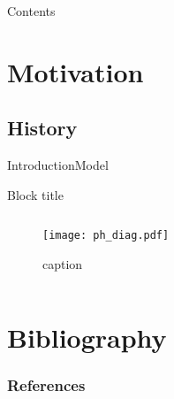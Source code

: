 \documentclass[10pt, compress]{beamer}
\title{}
\subtitle{}
\date{\today}
\author{}
\institute{}
\begin{document}
\maketitle

\begin{frame}{Contents}
	\tableofcontents
\end{frame}

\section{Motivation}

\subsection{History}

\begin{frame}{Introduction}{Model}

	\begin{block}{Block title}
	\end{block}

	\begin{columns}
		\begin{column}{0.48\textwidth}
			\begin{figure}
				\hspace*{-0.68 cm}
				\texttt{[image: ph\_diag.pdf]}
				\vspace{-0.20 cm}
				\caption{caption}
			\end{figure}
		\end{column}

		\begin{column}{0.5\textwidth}
		\end{column}
	\end{columns}
\end{frame}


\section*{Bibliography}
\begin{frame}[allowframebreaks]
	\frametitle{References}
	\printbibliography
\end{frame}
\end{document}
